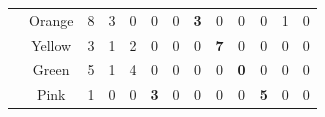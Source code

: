 \documentclass[runningheads]{llncs}
\begin{document}
\begin{table}[]
{\begin{tabular}{ccccccccccccc}
\multicolumn{1}{|l|}{}                                & \multicolumn{1}{c|}{Orange}    & \multicolumn{1}{c|}{8}                                    & \multicolumn{1}{c|}{3}                                    & \multicolumn{1}{c|}{0}                                    & \multicolumn{1}{c|}{0}                                  & \multicolumn{1}{c|}{0}                                  & \multicolumn{1}{c|}{\cellcolor[HTML]{32CB00}\textbf{3}} & \multicolumn{1}{c|}{0}                                  & \multicolumn{1}{c|}{0}                                  & \multicolumn{1}{c|}{0}                                  & \multicolumn{1}{c|}{1}                                  & \multicolumn{1}{c|}{0}                                  \\ \cline{2-13} 
\multicolumn{1}{|l|}{}                                & \multicolumn{1}{c|}{Yellow}    & \multicolumn{1}{c|}{3}                                    & \multicolumn{1}{c|}{1}                                    & \multicolumn{1}{c|}{2}                                    & \multicolumn{1}{c|}{0}                                  & \multicolumn{1}{c|}{0}                                  & \multicolumn{1}{c|}{0}                                  & \multicolumn{1}{c|}{\cellcolor[HTML]{32CB00}\textbf{7}} & \multicolumn{1}{c|}{0}                                  & \multicolumn{1}{c|}{0}                                  & \multicolumn{1}{c|}{0}                                  & \multicolumn{1}{c|}{0}                                  \\ \cline{2-13} 
\multicolumn{1}{|l|}{}                                & \multicolumn{1}{c|}{Green}     & \multicolumn{1}{c|}{5}                                    & \multicolumn{1}{c|}{1}                                    & \multicolumn{1}{c|}{4}                                    & \multicolumn{1}{c|}{0}                                  & \multicolumn{1}{c|}{0}                                  & \multicolumn{1}{c|}{0}                                  & \multicolumn{1}{c|}{0}                                  & \multicolumn{1}{c|}{\cellcolor[HTML]{C0C0C0}\textbf{0}} & \multicolumn{1}{c|}{0}                                  & \multicolumn{1}{c|}{0}                                  & \multicolumn{1}{c|}{0}                                  \\ \cline{2-13} 
\multicolumn{1}{|l|}{}                                & \multicolumn{1}{c|}{Pink}      & \multicolumn{1}{c|}{1}                                    & \multicolumn{1}{c|}{0}                                    & \multicolumn{1}{c|}{0}                                    & \multicolumn{1}{c|}{\cellcolor[HTML]{FE0000}\textbf{3}} & \multicolumn{1}{c|}{0}                                  & \multicolumn{1}{c|}{0}                                  & \multicolumn{1}{c|}{0}                                  & \multicolumn{1}{c|}{0}                                  & \multicolumn{1}{c|}{\cellcolor[HTML]{32CB00}\textbf{5}} & \multicolumn{1}{c|}{0}                                  & \multicolumn{1}{c|}{0}                                  \\ \cline{2-13} 

\end{tabular}}
\end{table}
\end{document}
